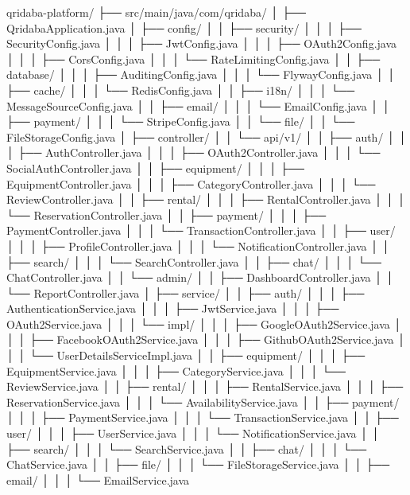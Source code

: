 qridaba-platform/
├── src/main/java/com/qridaba/
│   ├── QridabaApplication.java
│   ├── config/
│   │   ├── security/
│   │   │   ├── SecurityConfig.java
│   │   │   ├── JwtConfig.java
│   │   │   ├── OAuth2Config.java
│   │   │   ├── CorsConfig.java
│   │   │   └── RateLimitingConfig.java
│   │   ├── database/
│   │   │   ├── AuditingConfig.java
│   │   │   └── FlywayConfig.java
│   │   ├── cache/
│   │   │   └── RedisConfig.java
│   │   ├── i18n/
│   │   │   └── MessageSourceConfig.java
│   │   ├── email/
│   │   │   └── EmailConfig.java
│   │   ├── payment/
│   │   │   └── StripeConfig.java
│   │   └── file/
│   │       └── FileStorageConfig.java
│   ├── controller/
│   │   └── api/v1/
│   │       ├── auth/
│   │       │   ├── AuthController.java
│   │       │   ├── OAuth2Controller.java
│   │       │   └── SocialAuthController.java
│   │       ├── equipment/
│   │       │   ├── EquipmentController.java
│   │       │   ├── CategoryController.java
│   │       │   └── ReviewController.java
│   │       ├── rental/
│   │       │   ├── RentalController.java
│   │       │   └── ReservationController.java
│   │       ├── payment/
│   │       │   ├── PaymentController.java
│   │       │   └── TransactionController.java
│   │       ├── user/
│   │       │   ├── ProfileController.java
│   │       │   └── NotificationController.java
│   │       ├── search/
│   │       │   └── SearchController.java
│   │       ├── chat/
│   │       │   └── ChatController.java
│   │       └── admin/
│   │           ├── DashboardController.java
│   │           └── ReportController.java
│   ├── service/
│   │   ├── auth/
│   │   │   ├── AuthenticationService.java
│   │   │   ├── JwtService.java
│   │   │   ├── OAuth2Service.java
│   │   │   └── impl/
│   │   │       ├── GoogleOAuth2Service.java
│   │   │       ├── FacebookOAuth2Service.java
│   │   │       ├── GithubOAuth2Service.java
│   │   │       └── UserDetailsServiceImpl.java
│   │   ├── equipment/
│   │   │   ├── EquipmentService.java
│   │   │   ├── CategoryService.java
│   │   │   └── ReviewService.java
│   │   ├── rental/
│   │   │   ├── RentalService.java
│   │   │   ├── ReservationService.java
│   │   │   └── AvailabilityService.java
│   │   ├── payment/
│   │   │   ├── PaymentService.java
│   │   │   └── TransactionService.java
│   │   ├── user/
│   │   │   ├── UserService.java
│   │   │   └── NotificationService.java
│   │   ├── search/
│   │   │   └── SearchService.java
│   │   ├── chat/
│   │   │   └── ChatService.java
│   │   ├── file/
│   │   │   └── FileStorageService.java
│   │   ├── email/
│   │   │   └── EmailService.java
